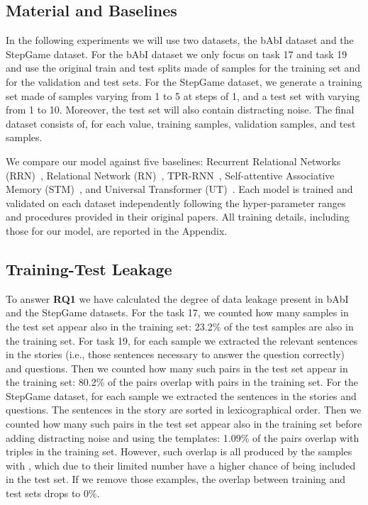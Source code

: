 \documentclass[letterpaper]{article} \usepackage{aaai22}  \usepackage{times}  \usepackage{helvet}  \usepackage{courier}  \usepackage[hyphens]{url}  \usepackage{graphicx} \urlstyle{rm} \def\UrlFont{\rm}  \usepackage{natbib}  \usepackage{caption} \DeclareCaptionStyle{ruled}{labelfont=normalfont,labelsep=colon,strut=off} \frenchspacing  \setlength{\pdfpagewidth}{8.5in}  \setlength{\pdfpageheight}{11in}  \usepackage{algorithm}
\begin{document}
\subsection{Material and Baselines}

In the following experiments we will use two datasets, the bAbI dataset and the StepGame dataset.
For the bAbI dataset we only focus on task 17 and task 19 and use the original train and test splits made of  samples for the training set and  for the validation and test sets.
For the StepGame dataset, we generate a training set made of samples varying  from 1 to 5 at steps of 1, and a test set with  varying from 1 to 10. Moreover, the test set will also contain distracting noise. The final dataset consists of, for each  value,  training samples,  validation samples, and  test samples. 

We compare our model against five baselines: 
Recurrent Relational Networks (RRN)~\cite{palm2018recurrent}, Relational Network (RN)~\cite{santoro2017simple}, TPR-RNN~\cite{schlag2018learning}, Self-attentive Associative Memory (STM)~\cite{le2020self}, and 
Universal Transformer (UT)~\cite{dehghani2018universal}. 
Each model is trained and validated on each dataset independently following the hyper-parameter ranges and procedures provided in their original papers.
All training details, including those for our model, are reported in the Appendix.

\subsection{Training-Test Leakage}

To answer \textbf{RQ1} 
we have calculated the degree of data leakage present in bAbI and the StepGame datasets.
For the task 17, we counted how many samples in the test set appear also in the training set: 23.2\% of the test samples are also in the training set.
For task 19, for each sample we extracted the relevant sentences in the stories (i.e., those sentences necessary to answer the question correctly) and questions. Then we counted how many such pairs in the test set appear in the training set: 
80.2\% of the pairs overlap with pairs in the training set.
For the StepGame dataset, for each sample we extracted the sentences in the stories and questions. The sentences in the story are sorted in lexicographical order. Then we counted how many such pairs in the test set appear also in the training set before adding distracting noise and using the templates: 
1.09\% of the pairs overlap with triples in the training set. 
However, such overlap is all produced by the samples with , which due to their limited number have a higher chance of being included in the test set.
If we remove those examples, the overlap between training and test sets drops to 0\%.
\end{document}
